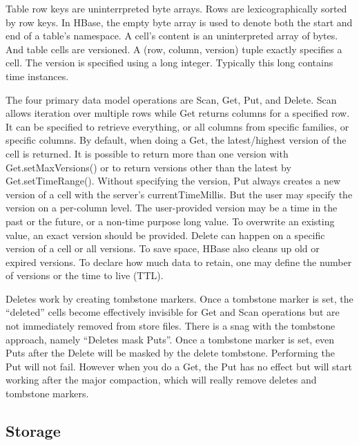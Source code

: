 \documentclass[12pt]{book}
\begin{document}
Table row keys are uninterrpreted byte arrays. Rows are lexicographically sorted by row keys. In HBase, the empty byte array is used to denote both the start and end of a table's namespace.
A cell's content is an uninterpreted array of bytes. And table cells are versioned. A (row, column, version) tuple exactly specifies a cell. The version is specified using a long integer. Typically this long contains time instances.

The four primary data model operations are Scan, Get, Put, and Delete. Scan allows iteration over multiple rows while Get returns columns for a specified row. It can be specified to retrieve everything, or all columns from specific families, or specific columns.
By default, when doing a Get, the latest/highest version of the cell is returned. It is possible to return more than one version with Get.setMaxVersions() or to return versions other than the latest by Get.setTimeRange(). Without specifying the version, Put always creates a new version of a cell with the server's currentTimeMillis. But the user may specify the version on a per-column level. The user-provided version may be a time in the past or the future, or a non-time purpose long value. To overwrite an existing value, an exact version should be provided. Delete can happen on a specific version of a cell or all versions. To save space, HBase also cleans up old or expired versions. To declare how much data to retain, one may define the number of versions or the time to live (TTL).

Deletes work by creating tombstone markers. Once a tombstone marker is set, the ``deleted'' cells become effectively invisible for Get and Scan operations but are not immediately removed from store files. There is a snag with the tombstone approach, namely ``Deletes mask Puts''. Once a tombstone marker is set, even Puts after the Delete will be masked by the delete tombstone. Performing the Put will not fail. However when you do a Get, the Put has no effect but will start working  after the major compaction, which will really remove deletes and tombstone markers.

\subsection{Storage}
\end{document}
